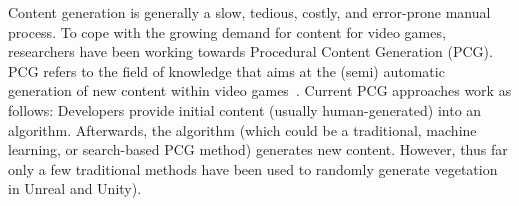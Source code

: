 


Content generation is generally a slow, tedious, costly, and error-prone manual process. To cope with the growing demand for content for video games, researchers have been working towards Procedural Content Generation (PCG). PCG refers to the field of knowledge that aims at the (semi) automatic generation of new content within video games~\cite{hendrikx2013procedural}. Current PCG approaches work as follows: Developers provide initial content (usually human-generated) into an algorithm. Afterwards, the algorithm (which could be a traditional, machine learning, or search-based PCG method) generates new content. However, thus far only a few traditional methods have been used to randomly generate vegetation~\cite{speedtreeweb} in Unreal and Unity).

